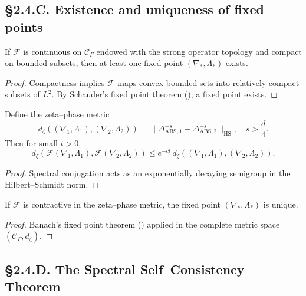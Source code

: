 \subsection*{§2.4.C. Existence and uniqueness of fixed points}

\begin{theorem}\label{thm:2.4.exist}
If $\mathcal{F}$ is continuous on $\mathcal{C}_\Gamma$ endowed with the strong operator topology and compact on bounded subsets, then at least one fixed point $(\nabla_\ast,\Lambda_\ast)$ exists.
\end{theorem}

\begin{proof}
Compactness implies $\mathcal{F}$ maps convex bounded sets into relatively compact subsets of $L^2$.  
By Schauder’s fixed point theorem (\cite{Schaefer1974}), a fixed point exists.
\end{proof}

\begin{lemma}
Define the zeta–phase metric 
\[
d_\zeta((\nabla_1,\Lambda_1),(\nabla_2,\Lambda_2))
= \|\Delta_{\mathrm{ABS},1}^{-s}-\Delta_{\mathrm{ABS},2}^{-s}\|_{\mathrm{HS}},
\quad s>\frac{d}{4}.
\]
Then for small $t>0$,
\[
d_\zeta(\mathcal{F}(\nabla_1,\Lambda_1),\mathcal{F}(\nabla_2,\Lambda_2))
\le e^{-c t}\, d_\zeta((\nabla_1,\Lambda_1),(\nabla_2,\Lambda_2)).
\]
\end{lemma}

\begin{proof}
Spectral conjugation acts as an exponentially decaying semigroup in the Hilbert–Schmidt norm.
\end{proof}

\begin{theorem}\label{thm:2.4.unique}
If $\mathcal{F}$ is contractive in the zeta–phase metric, the fixed point $(\nabla_\ast,\Lambda_\ast)$ is unique.
\end{theorem}

\begin{proof}
Banach’s fixed point theorem (\cite{Evans1998}) applied in the complete metric space $(\mathcal{C}_\Gamma,d_\zeta)$.
\end{proof}

\subsection*{§2.4.D. The Spectral Self–Consistency Theorem}

